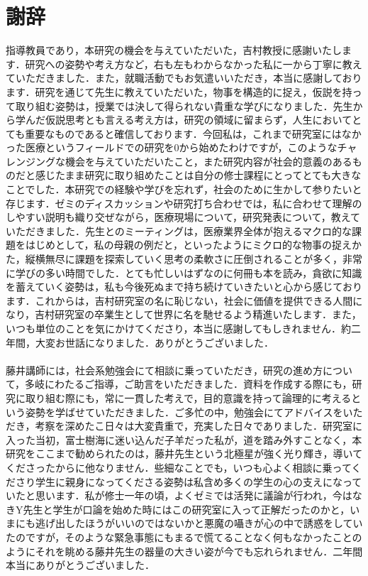 \chapter{謝辞}

指導教員であり，本研究の機会を与えていただいた，吉村教授に感謝いたします．研究への姿勢や考え方など，右も左もわからなかった私に一から丁寧に教えていただきました．また，就職活動でもお気遣いいただき，本当に感謝しております．研究を通じて先生に教えていただいた，物事を構造的に捉え，仮説を持って取り組む姿勢は，授業では決して得られない貴重な学びになりました．先生から学んだ仮説思考とも言える考え方は，研究の領域に留まらず，人生においてとても重要なものであると確信しております．今回私は，これまで研究室にはなかった医療というフィールドでの研究を0から始めたわけですが，このようなチャレンジングな機会を与えていただいたこと，また研究内容が社会的意義のあるものだと感じたまま研究に取り組めたことは自分の修士課程にとってとても大きなことでした．本研究での経験や学びを忘れず，社会のために生かして参りたいと存じます．ゼミのディスカッションや研究打ち合わせでは，私に合わせて理解のしやすい説明も織り交ぜながら，医療現場について，研究発表について，教えていただきました．先生とのミーティングは，医療業界全体が抱えるマクロ的な課題をはじめとして，私の母親の例だと，といったようにミクロ的な物事の捉えかた，縦横無尽に課題を探索していく思考の柔軟さに圧倒されることが多く，非常に学びの多い時間でした．とても忙しいはずなのに何冊も本を読み，貪欲に知識を蓄えていく姿勢は，私も今後死ぬまで持ち続けていきたいと心から感じております．これからは，吉村研究室の名に恥じない，社会に価値を提供できる人間になり，吉村研究室の卒業生として世界に名を馳せるよう精進いたします．また，いつも単位のことを気にかけてくださり，本当に感謝してもしきれません．約二年間，大変お世話になりました．ありがとうございました．\\
\\
藤井講師には，社会系勉強会にて相談に乗っていただき，研究の進め方について，多岐にわたるご指導，ご助言をいただきました．資料を作成する際にも，研究に取り組む際にも，常に一貫した考えで，目的意識を持って論理的に考えるという姿勢を学ばせていただきました．ご多忙の中，勉強会にてアドバイスをいただき，考察を深めたこ日々は大変貴重で，充実した日々でありました．研究室に入った当初，富士樹海に迷い込んだ子羊だった私が，道を踏み外すことなく，本研究をここまで勧められたのは，藤井先生という北極星が強く光り輝き，導いてくださったからに他なりません．些細なことでも，いつも心よく相談に乗ってくださり学生に親身になってくださる姿勢は私含め多くの学生の心の支えになっていたと思います．私が修士一年の頃，よくゼミでは活発に議論が行われ，今はなきY先生と学生が口論を始めた時にはこの研究室に入って正解だったのかと，いまにも逃げ出したほうがいいのではないかと悪魔の囁きが心の中で誘惑をしていたのですが，そのような緊急事態にもまるで慌てることなく何もなかったことのようにそれを眺める藤井先生の器量の大きい姿が今でも忘れられません．二年間本当にありがとうございました．\\
